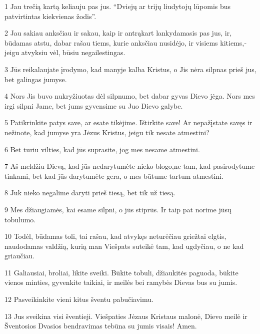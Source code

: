\par 1 Jau trečią kartą keliauju pas jus. “Dviejų ar trijų liudytojų lūpomis bus patvirtintas kiekvienas žodis”. 
\par 2 Jau sakiau anksčiau ir sakau, kaip ir antrąkart lankydamasis pas jus, ir, būdamas atstu, dabar rašau tiems, kurie anksčiau nusidėjo, ir visiems kitiems,­jeigu atvyksiu vėl, būsiu negailestingas. 
\par 3 Jūs reikalaujate įrodymo, kad manyje kalba Kristus, o Jis nėra silpnas prieš jus, bet galingas jumyse. 
\par 4 Nors Jis buvo nukryžiuotas dėl silpnumo, bet dabar gyvas Dievo jėga. Nors mes irgi silpni Jame, bet jums gyvensime su Juo Dievo galybe. 
\par 5 Patikrinkite patys save, ar esate tikėjime. Ištirkite save! Ar nepažįstate savęs ir nežinote, kad jumyse yra Jėzus Kristus, jeigu tik nesate atmestini? 
\par 6 Bet turiu vilties, kad jūs suprasite, jog mes nesame atmestini. 
\par 7 Aš meldžiu Dievą, kad jūs nedarytumėte nieko blogo,­ne tam, kad pasirodytume tinkami, bet kad jūs darytumėte gera, o mes būtume tartum atmestini. 
\par 8 Juk nieko negalime daryti prieš tiesą, bet tik už tiesą. 
\par 9 Mes džiaugiamės, kai esame silpni, o jūs stiprūs. Ir taip pat norime jūsų tobulumo. 
\par 10 Todėl, būdamas toli, tai rašau, kad atvykęs neturėčiau griežtai elgtis, naudodamas valdžią, kurią man Viešpats suteikė tam, kad ugdyčiau, o ne kad griaučiau. 
\par 11 Galiausiai, broliai, likite sveiki. Būkite tobuli, džiaukitės paguoda, būkite vienos minties, gyvenkite taikiai, ir meilės bei ramybės Dievas bus su jumis. 
\par 12 Pasveikinkite vieni kitus šventu pabučiavimu. 
\par 13 Jus sveikina visi šventieji. Viešpaties Jėzaus Kristaus malonė, Dievo meilė ir Šventosios Dvasios bendravimas tebūna su jumis visais! Amen.



